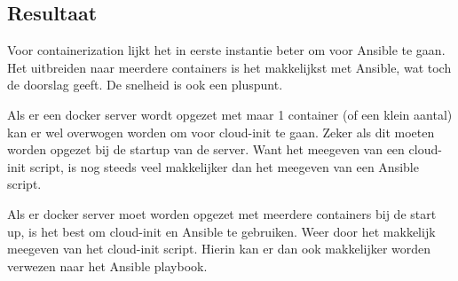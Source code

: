 \subsection{Resultaat}
Voor containerization lijkt het in eerste instantie beter om voor Ansible te gaan. Het uitbreiden naar meerdere containers is het makkelijkst met Ansible, wat toch de doorslag geeft. De snelheid is ook een pluspunt.

Als er een docker server wordt opgezet met maar 1 container (of een klein aantal) kan er wel overwogen worden om voor cloud-init te gaan. Zeker als dit moeten worden opgezet bij de startup van de server. Want het meegeven van een cloud-init script, is nog steeds veel makkelijker dan het meegeven van een Ansible script. 

Als er docker server moet worden opgezet met meerdere containers bij de start up, is het best om cloud-init en Ansible te gebruiken. Weer door het makkelijk meegeven van het cloud-init script. Hierin kan er dan ook makkelijker worden verwezen naar het Ansible playbook.
